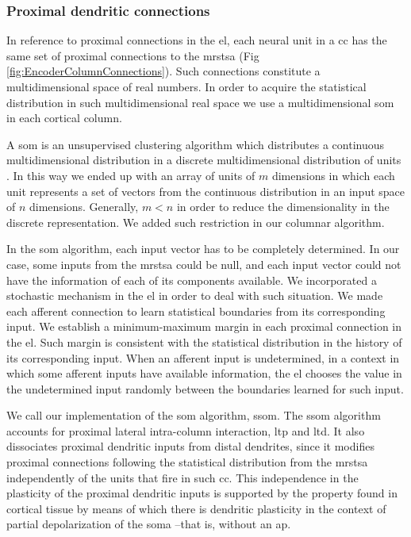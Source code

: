 \documentclass[11pt,a4paper]{article}
\begin{document}
\subsubsection*{Proximal dendritic connections}

In reference to proximal connections in the \gls{el}, each neural unit in a \gls{cc} has the same set of
proximal connections to the \gls{mrstsa} (Fig \ref{fig:EncoderColumnConnections}).
Such connections constitute a multidimensional space of real numbers.
In order to acquire the statistical distribution in such multidimensional real space we use
a multidimensional \gls{som} in each cortical column.

A \gls{som} is an unsupervised clustering algorithm which distributes a continuous multidimensional distribution
in a discrete multidimensional distribution of units \cite{Kohonen:1989:SAM:69371, kohonen_2082}.
In this way we ended up with an array of units of $m$ dimensions in which each unit
represents a set of vectors from the continuous distribution in an input space of $n$ dimensions.
Generally, $m < n$ in order to reduce the dimensionality in the discrete representation.
We added such restriction in our columnar algorithm.

In the \gls{som} algorithm, each input vector has to be completely determined.
In our case, some inputs from the \gls{mrstsa} could be null,
and each input vector could not have the information of each of its components available.
We incorporated a stochastic mechanism in the \gls{el} in order to deal with such situation.
We made each afferent connection to learn statistical boundaries from its corresponding input.
We establish a minimum-maximum margin in each proximal connection in the \gls{el}.
Such margin is consistent with the statistical distribution in the history of its corresponding input.
When an afferent input is undetermined, in a context in which some afferent inputs have
available information,
the \gls{el} chooses
the value in the undetermined input
randomly
between the boundaries learned for such input.

We call our implementation of the \gls{som} algorithm, \gls{ssom}.
The \gls{ssom} algorithm accounts for proximal lateral intra-column interaction, \gls{ltp} and
\gls{ltd}.
It also dissociates proximal dendritic inputs from distal dendrites, since
it modifies
proximal connections
following the statistical distribution from the
\gls{mrstsa} independently of the units that fire in such \gls{cc}.
This independence in the plasticity of the proximal dendritic inputs
is supported by
the
property
found in cortical tissue by means of which there is dendritic plasticity
in the context of partial depolarization of the soma \cite{reiter_1998}--that is, without an \gls{ap}. %
\end{document}
